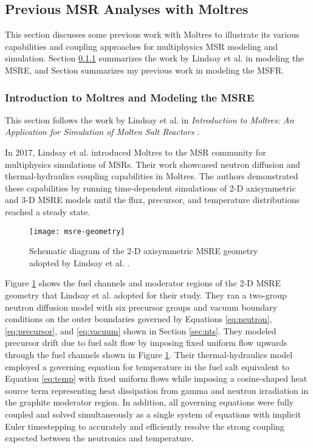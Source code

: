 \subsection{Previous \gls{MSR} Analyses with Moltres} \label{sec:moltres-previous}

This section discusses some previous work with Moltres to illustrate its
various capabilities and coupling approaches for multiphysics \gls{MSR}
modeling and simulation. Section \ref{sec:msre} summarizes the work by Lindsay et
al. \cite{lindsay_introduction_2018} in modeling the \gls{MSRE}, and Section
\cite{park_advancement_2020} summarizes my previous work in modeling the
\gls{MSFR}.

\subsubsection{Introduction to Moltres and Modeling the MSRE} \label{sec:msre}

This section follows the work by Lindsay et al. in \textit{Introduction to Moltres:
An Application for Simulation of Molten Salt Reactors}
\cite{lindsay_introduction_2018}.

In 2017, Lindsay et al. introduced
Moltres to the \gls{MSR} community for multiphysics simulations of \glspl{MSR}.
Their work showcased neutron diffusion and thermal-hydraulics coupling
capabilities in Moltres. The authors
demonstrated these capabilities by running time-dependent simulations of 2-D
axisymmetric and 3-D \gls{MSRE} models until the flux, precursor, and
temperature distributions reached a steady state.

\begin{figure}[htb!]
	\centering
	\texttt{[image: msre-geometry]}
	\caption{Schematic diagram of the 2-D axisymmetric \gls{MSRE} geometry
	adopted by Lindsay et al. \cite{lindsay_introduction_2018}.}
	\label{fig:msre-geometry}
\end{figure}

Figure \ref{fig:msre-geometry} shows the fuel channels and moderator regions of
the 2-D \gls{MSRE} geometry that Lindsay et al. adopted for their study.
They ran a two-group neutron diffusion model with six precursor groups and
vacuum boundary conditions on the outer boundaries governed by Equations
\ref{eq:neutron}, \ref{eq:precursor}, and \ref{eq:vacuum} shown in Section
\ref{sec:nts}. They modeled precursor drift due to fuel salt flow by imposing
fixed uniform flow upwards through the fuel channels shown in Figure
\ref{fig:msre-geometry}. Their thermal-hydraulics model employed a
governing equation for temperature in the fuel salt equivalent to Equation
\ref{eq:temp} with fixed uniform flows while imposing a cosine-shaped heat
source term representing heat dissipation from gamma and neutron irradiation in
the graphite moderator region. In addition, all governing equations were fully
coupled and solved simultaneously as a single system of equations with implicit
Euler timestepping to accurately and efficiently resolve the strong coupling
expected between the neutronics and temperature.

